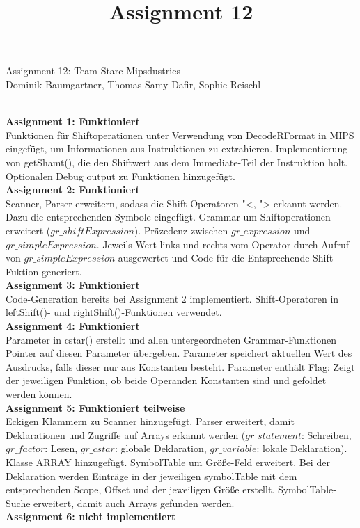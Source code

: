 \documentclass[10pt, a4paper]{article}
\title{Assignment 12}
\author{}
\date{}
\begin{document}
\begin{center}
	Assignment 12: Team Starc Mipsdustries\\
	Dominik Baumgartner, Thomas Samy Dafir, Sophie Reischl
\end{center}	

\ \\
\textbf{Assignment 1: Funktioniert}\\
Funktionen für Shiftoperationen unter Verwendung von DecodeRFormat in MIPS eingefügt, um Informationen aus Instruktionen zu extrahieren. Implementierung von getShamt(), die den Shiftwert aus dem Immediate-Teil der Instruktion holt. Optionalen Debug output zu Funktionen hinzugefügt.
\ \\ 
\textbf{Assignment 2: Funktioniert}\\
Scanner, Parser erweitern, sodass die Shift-Operatoren "<, "> erkannt werden. Dazu die entsprechenden Symbole eingefügt. Grammar um Shiftoperationen erweitert ($gr\_shiftExpression$). Präzedenz zwischen $gr\_expression$ und $gr\_simpleExpression$. Jeweils Wert links und rechts vom Operator durch Aufruf von $gr\_simpleExpression$ ausgewertet und Code für die Entsprechende Shift-Fuktion generiert. 
\ \\
\textbf{Assignment 3: Funktioniert}\\
Code-Generation bereits bei Assignment 2 implementiert.
Shift-Operatoren in leftShift()- und rightShift()-Funktionen verwendet.
\\
\textbf{Assignment 4: Funktioniert}\\
Parameter in cstar() erstellt und allen untergeordneten Grammar-Funktionen Pointer auf diesen Parameter übergeben. Parameter speichert aktuellen Wert des Ausdrucks, falls dieser nur aus Konstanten besteht. Parameter enthält Flag: Zeigt der jeweiligen Funktion, ob beide Operanden Konstanten sind und gefoldet werden können.
\\
\textbf{Assignment 5: Funktioniert teilweise}\\
Eckigen Klammern zu Scanner hinzugefügt. Parser erweitert, damit Deklarationen und Zugriffe auf Arrays erkannt werden ($gr\_statement$: Schreiben, $gr\_factor$: Lesen, $gr\_cstar$: globale Deklaration, $gr\_variable$: lokale Deklaration). Klasse ARRAY hinzugefügt. SymbolTable um Größe-Feld erweitert. Bei der Deklaration werden Einträge in der jeweiligen symbolTable mit dem entsprechenden Scope, Offset und der jeweiligen Größe erstellt. SymbolTable-Suche erweitert, damit auch Arrays gefunden werden.
\\
\textbf{Assignment 6: nicht implementiert}\\
\end{document}
